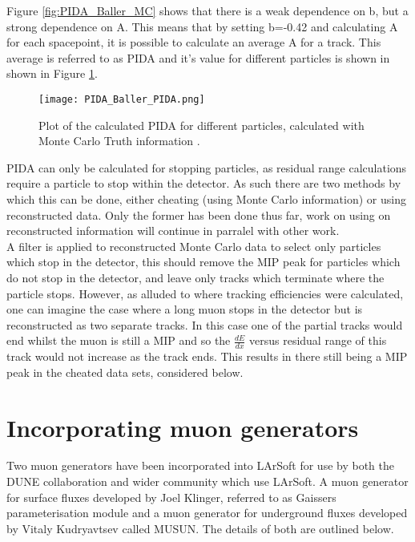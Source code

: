 \documentclass[11pt]{report} %
\begin{document}
{Figure \ref{fig:PIDA_Baller_MC} shows that there is a weak dependence on b, but a strong dependence on A. This means that by setting b=-0.42 and calculating A for each spacepoint, it is possible to calculate an average A for a track. This average is referred to as PIDA and it's value for different particles is shown in shown in Figure \ref{fig:PIDA_Baller_PIDA}. \\

\begin{figure}[h]
  \centering
  \texttt{[image: PIDA\_Baller\_PIDA.png]}
  \caption{Plot of the calculated PIDA for different particles, calculated with Monte Carlo Truth information \cite{PIDA}.}
  \label{fig:PIDA_Baller_PIDA}
\end{figure}

PIDA can only be calculated for stopping particles, as residual range calculations require a particle to stop within the detector. As such there are two methods by which this can be done, either cheating (using Monte Carlo information) or using reconstructed data. Only the former has been done thus far, work on using on reconstructed information will continue in parralel with other work. \\

A filter is applied to reconstructed Monte Carlo data to select only particles which stop in the detector, this should remove the MIP peak for particles which do not stop in the detector, and leave only tracks which terminate where the particle stops. However, as alluded to where tracking efficiencies were calculated, one can imagine the case where a long muon stops in the detector but is reconstructed as two separate tracks. In this case one of the partial tracks would end whilst the muon is still a MIP and so the $\frac{dE}{dx}$ versus residual range of this track would not increase as the track ends. This results in there still being a MIP peak in the cheated data sets, considered below. \\



\section{Incorporating muon generators}
Two muon generators have been incorporated into LArSoft for use by both the DUNE collaboration and wider community which use LArSoft. A muon generator for surface fluxes developed by Joel Klinger, referred to as Gaissers parameterisation module and a muon generator for underground fluxes developed by Vitaly Kudryavtsev called MUSUN. The details of both are outlined below.

}
\end{document}
